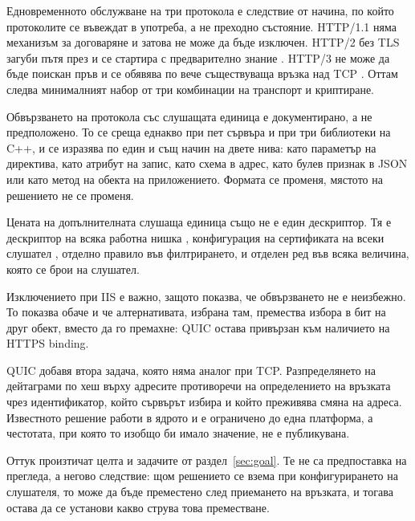 Едновременното обслужване на три протокола е следствие от начина, по който протоколите се
въвеждат в употреба, а не преходно състояние. HTTP/1.1 няма механизъм за договаряне и затова
не може да бъде изключен. HTTP/2 без TLS загуби пътя през  и се стартира с
предварително знание \cite{rfc9113}. HTTP/3 не може да бъде поискан пръв и се обявява по вече
съществуваща връзка над TCP \cite{rfc9114, rfc7838}. Оттам следва минималният набор от три
комбинации на транспорт и криптиране.

Обвързването на протокола със слушащата единица е документирано, а не предположено. То се
среща еднакво при пет сървъра и при три библиотеки на C++, и се изразява по един и същ начин
на двете нива: като параметър на директива, като атрибут на запис, като схема в адрес, като
булев признак в JSON или като метод на обекта на приложението. Формата се променя, мястото на
решението не се променя.

Цената на допълнителната слушаща единица също не е един дескриптор. Тя е дескриптор на всяка
работна нишка \cite{nginxlisten}, конфигурация на сертификата на всеки слушател
\cite{h2olisten, drogonconfig}, отделно правило във филтрирането, и отделен ред във всяка
величина, която се брои на слушател.

Изключението при IIS е важно, защото показва, че обвързването не е неизбежно. То показва
обаче и че алтернативата, избрана там, премества избора в бит на друг обект, вместо да го
премахне: QUIC остава привързан към наличието на HTTPS binding.

QUIC добавя втора задача, която няма аналог при TCP. Разпределянето на дейтаграми по хеш
върху адресите противоречи на определението на връзката чрез идентификатор, който сървърът
избира и който преживява смяна на адреса. Известното решение работи в ядрото и е ограничено
до една платформа, а честотата, при която то изобщо би имало значение, не е публикувана.

Оттук произтичат целта и задачите от раздел~\ref{sec:goal}. Те не са предпоставка на
прегледа, а негово следствие: щом решението се взема при конфигурирането на слушателя, то
може да бъде преместено след приемането на връзката, и тогава остава да се установи какво
струва това преместване.
